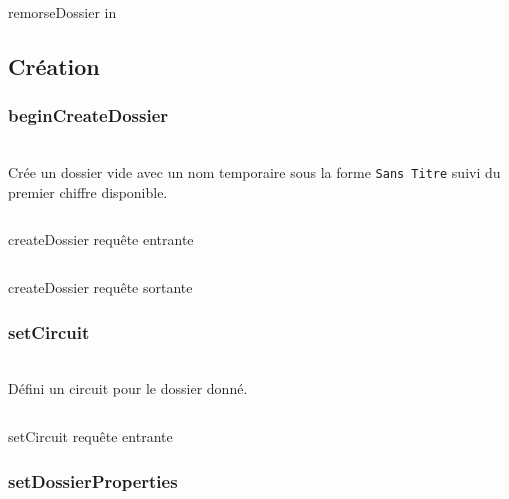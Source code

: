\begin{codesnippet}
\inputminted[frame=single,linenos,fontsize=\footnotesize]{javascript}{extraits/remorseDossier_in.js}
\caption{remorseDossier in}
\label{snip:remorseDossier_in}
\end{codesnippet}

\subsection{Création}

\subsubsection{beginCreateDossier}
\\

Crée un dossier vide avec un nom temporaire sous la forme \verb|Sans Titre| suivi du premier chiffre disponible.

\begin{codesnippet}
\inputminted[frame=single,linenos,fontsize=\footnotesize]{javascript}{extraits/createDossier_in.js}
\caption{createDossier requête entrante}
\label{snip:getDossier_in}
\end{codesnippet}

\begin{codesnippet}
\inputminted[frame=single,linenos,fontsize=\footnotesize]{javascript}{extraits/createDossier_out.js}
\caption{createDossier requête sortante}
\label{snip:getDossier_out}
\end{codesnippet}


\subsubsection{setCircuit}
\\

Défini un circuit pour le dossier donné.

\begin{codesnippet}
\inputminted[frame=single,linenos,fontsize=\footnotesize]{javascript}{extraits/setCircuit_in.js}
\caption{setCircuit requête entrante}
\label{snip:setCircuit_in}
\end{codesnippet}



\subsubsection{setDossierProperties}
\\

